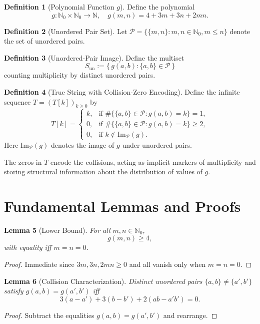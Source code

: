 \documentclass[12pt]{article}
\theoremstyle{definition}
\newtheorem{definition}{Definition}[section]
\theoremstyle{plain}
\newtheorem{lemma}[definition]{Lemma}
\begin{document}
\begin{definition}[Polynomial Function \(g\)]
Define the polynomial
\[
g: \mathbb{N}_0 \times \mathbb{N}_0 \to \mathbb{N}, \quad g(m,n) = 4 + 3m + 3n + 2mn.
\]
\end{definition}

\begin{definition}[Unordered Pair Set]
Let \(\mathcal{P} = \{\{m,n\}: m,n\in\mathbb{N}_0, m\leq n\}\) denote the set of unordered pairs.
\end{definition}

\begin{definition}[Unordered-Pair Image]
Define the multiset
\[
S_{\text{un}} := \{\, g(a,b) : \{a,b\} \in \mathcal{P} \,\}
\]
counting multiplicity by distinct unordered pairs.
\end{definition}

\begin{definition}[True String with Collision-Zero Encoding]
Define the infinite sequence \(T=(T[k])_{k\geq 0}\) by
\[
T[k]=
\begin{cases}
k, &\text{if } \#\{\{a,b\}\in\mathcal{P} : g(a,b)=k\} = 1, \\[4pt]
0, &\text{if } \#\{\{a,b\}\in\mathcal{P} : g(a,b)=k\} \geq 2, \\[4pt]
0, &\text{if } k\notin\mathrm{Im}_{\mathcal{P}}(g).
\end{cases}
\]
Here \(\mathrm{Im}_{\mathcal{P}}(g)\) denotes the image of \(g\) under unordered pairs.
\end{definition}

\begin{remark}
The zeros in \(T\) encode the collisions, acting as implicit markers of multiplicity and storing structural information about the distribution of values of \(g\).
\end{remark}

\section{Fundamental Lemmas and Proofs}

\begin{lemma}[Lower Bound]
For all \(m,n\in\mathbb{N}_0\),
\[
g(m,n) \geq 4,
\]
with equality iff \(m=n=0\).
\end{lemma}
\begin{proof}
Immediate since \(3m, 3n, 2mn \geq 0\) and all vanish only when \(m=n=0\).
\end{proof}

\begin{lemma}[Collision Characterization]
Distinct unordered pairs \(\{a,b\} \neq \{a',b'\}\) satisfy \(g(a,b)=g(a',b')\) iff
\[
3(a-a') + 3(b-b') + 2(ab - a'b') = 0.
\]
\end{lemma}
\begin{proof}
Subtract the equalities \(g(a,b)=g(a',b')\) and rearrange.
\end{proof}
\end{document}
